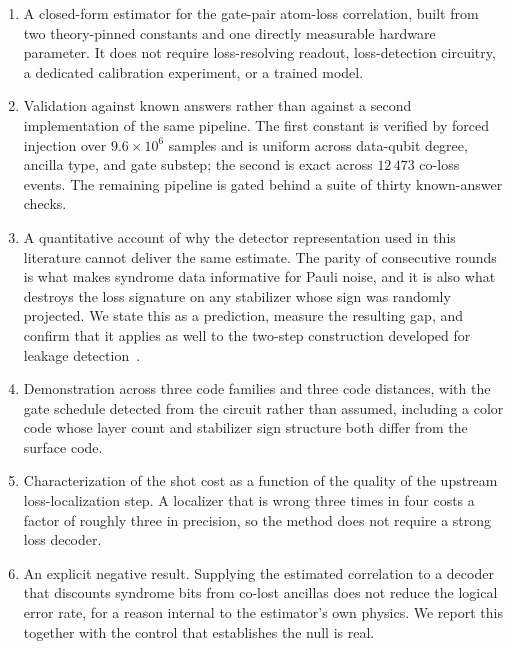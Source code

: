 \documentclass{ieeeaccess}
\begin{document}
\begin{enumerate}
  \item A closed-form estimator for the gate-pair atom-loss correlation, built
        from two theory-pinned constants and one directly measurable hardware
        parameter. It does not require loss-resolving readout, loss-detection
        circuitry, a dedicated calibration experiment, or a trained model.
  \item Validation against known answers rather than against a second
        implementation of the same pipeline. The first constant is verified by
        forced injection over $9.6\times10^{6}$ samples and is uniform across
        data-qubit degree, ancilla type, and gate substep; the second is exact
        across $12\,473$ co-loss events. The remaining
        pipeline is gated behind a suite of thirty known-answer checks.
  \item A quantitative account of why the detector representation used in this
        literature cannot deliver the same estimate. The parity of consecutive
        rounds is what makes syndrome data informative for Pauli noise, and it
        is also what destroys the loss signature on any stabilizer whose sign
        was randomly projected. We state this as a prediction, measure the
        resulting gap, and confirm that it applies as well to the two-step
        construction developed for leakage
        detection~\cite{bultink2020repetitiveparity,varbanov2020leakagedetection}.
  \item Demonstration across three code families and three code distances, with
        the gate schedule detected from the circuit rather than assumed,
        including a color code whose layer count and stabilizer sign structure
        both differ from the surface code.
  \item Characterization of the shot cost as a function of the quality of the
        upstream loss-localization step. A localizer that is wrong three times
        in four costs a factor of roughly three in precision, so the method
        does not require a strong loss decoder.
  \item An explicit negative result. Supplying the estimated correlation to a
        decoder that discounts syndrome bits from co-lost ancillas does not
        reduce the logical error rate, for a reason internal to the estimator's
        own physics. We report this together with the control that establishes
        the null is real.
\end{enumerate}
\end{document}

